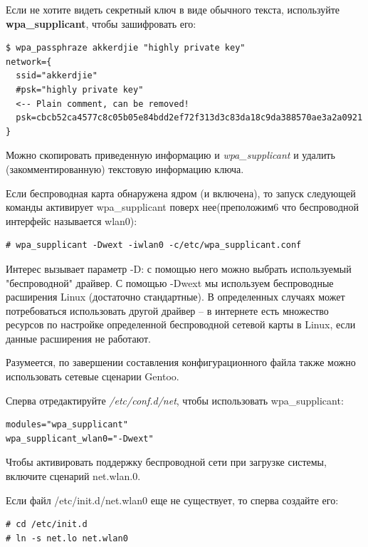 \documentclass[10pt]{book}
\begin{document}
Если не хотите видеть секретный ключ в виде обычного текста, используйте \textbf{wpa\_supplicant}, чтобы зашифровать его:

\begin{tcolorbox}
\begin{lstlisting}
$ wpa_passphraze akkerdjie "highly private key"
network={
  ssid="akkerdjie"
  #psk="highly private key"
  <-- Plain comment, can be removed!
  psk=cbcb52ca4577c8c05b05e84bdd2ef72f313d3c83da18c9da388570ae3a2a0921
}

\end{lstlisting}
\end{tcolorbox}

Можно скопировать приведенную информацию и \textit{wpa\_supplicant} и удалить (закомментированную) текстовую информацию ключа.

Если беспроводная карта обнаружена ядром (и включена), то запуск следующей команды активирует wpa\_supplicant поверх нее(преположим6 что беспроводной интерфейс называется wlan0):

\begin{tcolorbox}
\begin{lstlisting}
# wpa_supplicant -Dwext -iwlan0 -c/etc/wpa_supplicant.conf
\end{lstlisting}
\end{tcolorbox}

Интерес вызывает параметр -D: с помощью него можно выбрать используемый "беспроводной" драйвер. С помощью  -Dwext мы используем беспроводные расширения Linux (достаточно стандартные). В определенных случаях может потребоваться использовать другой драйвер -- в интернете есть множество ресурсов по настройке определенной беспроводной сетевой карты в Linux, если данные расширения не работают.

Разумеется, по завершении составления конфигурационного файла также можно использовать сетевые сценарии Gentoo.

Сперва отредактируйте \textit{/etc/conf.d/net}, чтобы использовать wpa\_supplicant:

\begin{tcolorbox}
\begin{lstlisting}
modules="wpa_supplicant"
wpa_supplicant_wlan0="-Dwext"
\end{lstlisting}
\end{tcolorbox}

Чтобы активировать поддержку беспроводной сети при загрузке системы, включите  сценарий net.wlan.0.

Если файл /etc/init.d/net.wlan0 еще не существует, то сперва создайте его:
\begin{tcolorbox}
\begin{lstlisting}
# cd /etc/init.d
# ln -s net.lo net.wlan0
\end{lstlisting}
\end{tcolorbox}
\end{document}
